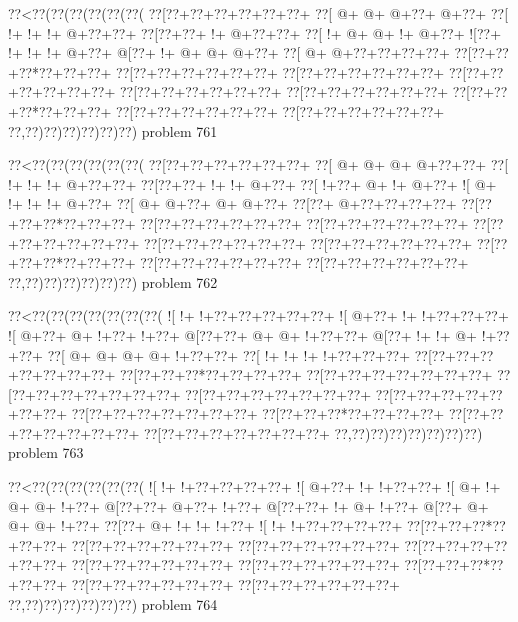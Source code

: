 \vbox{\vbox{\goo
\0??<\0??(\0??(\0??(\0??(\0??(\0??(
\0??[\0??+\0??+\0??+\0??+\0??+\0??+
\0??[\- @+\- @+\- @+\0??+\- @+\0??+
\0??[\- !+\- !+\- !+\- @+\0??+\0??+
\0??[\0??+\0??+\- !+\- @+\0??+\0??+
\0??[\- !+\- @+\- @+\- !+\- @+\0??+
\- ![\0??+\- !+\- !+\- !+\- @+\0??+
\- @[\0??+\- !+\- @+\- @+\- @+\0??+
\0??[\- @+\- @+\0??+\0??+\0??+\0??+
\0??[\0??+\0??+\0??*\0??+\0??+\0??+
\0??[\0??+\0??+\0??+\0??+\0??+\0??+
\0??[\0??+\0??+\0??+\0??+\0??+\0??+
\0??[\0??+\0??+\0??+\0??+\0??+\0??+
\0??[\0??+\0??+\0??+\0??+\0??+\0??+
\0??[\0??+\0??+\0??+\0??+\0??+\0??+
\0??[\0??+\0??+\0??*\0??+\0??+\0??+
\0??[\0??+\0??+\0??+\0??+\0??+\0??+
\0??[\0??+\0??+\0??+\0??+\0??+\0??+
\0??,\0??)\0??)\0??)\0??)\0??)\0??)
}
\hfil problem 761\hfil\break
}

\vbox{\vbox{\goo
\0??<\0??(\0??(\0??(\0??(\0??(\0??(
\0??[\0??+\0??+\0??+\0??+\0??+\0??+
\0??[\- @+\- @+\- @+\- @+\0??+\0??+
\0??[\- !+\- !+\- !+\- @+\0??+\0??+
\0??[\0??+\0??+\- !+\- !+\- @+\0??+
\0??[\- !+\0??+\- @+\- !+\- @+\0??+
\- ![\- @+\- !+\- !+\- !+\- @+\0??+
\0??[\- @+\- @+\0??+\- @+\- @+\0??+
\0??[\0??+\- @+\0??+\0??+\0??+\0??+
\0??[\0??+\0??+\0??*\0??+\0??+\0??+
\0??[\0??+\0??+\0??+\0??+\0??+\0??+
\0??[\0??+\0??+\0??+\0??+\0??+\0??+
\0??[\0??+\0??+\0??+\0??+\0??+\0??+
\0??[\0??+\0??+\0??+\0??+\0??+\0??+
\0??[\0??+\0??+\0??+\0??+\0??+\0??+
\0??[\0??+\0??+\0??*\0??+\0??+\0??+
\0??[\0??+\0??+\0??+\0??+\0??+\0??+
\0??[\0??+\0??+\0??+\0??+\0??+\0??+
\0??,\0??)\0??)\0??)\0??)\0??)\0??)
}
\hfil problem 762\hfil\break
}

\vbox{\vbox{\goo
\0??<\0??(\0??(\0??(\0??(\0??(\0??(\0??(
\- ![\- !+\- !+\0??+\0??+\0??+\0??+\0??+
\- ![\- @+\0??+\- !+\- !+\0??+\0??+\0??+
\- ![\- @+\0??+\- @+\- !+\0??+\- !+\0??+
\- @[\0??+\0??+\- @+\- @+\- !+\0??+\0??+
\- @[\0??+\- !+\- !+\- @+\- !+\0??+\0??+
\0??[\- @+\- @+\- @+\- @+\- !+\0??+\0??+
\0??[\- !+\- !+\- !+\- !+\0??+\0??+\0??+
\0??[\0??+\0??+\0??+\0??+\0??+\0??+\0??+
\0??[\0??+\0??+\0??*\0??+\0??+\0??+\0??+
\0??[\0??+\0??+\0??+\0??+\0??+\0??+\0??+
\0??[\0??+\0??+\0??+\0??+\0??+\0??+\0??+
\0??[\0??+\0??+\0??+\0??+\0??+\0??+\0??+
\0??[\0??+\0??+\0??+\0??+\0??+\0??+\0??+
\0??[\0??+\0??+\0??+\0??+\0??+\0??+\0??+
\0??[\0??+\0??+\0??*\0??+\0??+\0??+\0??+
\0??[\0??+\0??+\0??+\0??+\0??+\0??+\0??+
\0??[\0??+\0??+\0??+\0??+\0??+\0??+\0??+
\0??,\0??)\0??)\0??)\0??)\0??)\0??)\0??)
}
\hfil problem 763\hfil\break
}

\vbox{\vbox{\goo
\0??<\0??(\0??(\0??(\0??(\0??(\0??(
\- ![\- !+\- !+\0??+\0??+\0??+\0??+
\- ![\- @+\0??+\- !+\- !+\0??+\0??+
\- ![\- @+\- !+\- @+\- @+\- !+\0??+
\- @[\0??+\0??+\- @+\0??+\- !+\0??+
\- @[\0??+\0??+\- !+\- @+\- !+\0??+
\- @[\0??+\- @+\- @+\- @+\- !+\0??+
\0??[\0??+\- @+\- !+\- !+\- !+\0??+
\- ![\- !+\- !+\0??+\0??+\0??+\0??+
\0??[\0??+\0??+\0??*\0??+\0??+\0??+
\0??[\0??+\0??+\0??+\0??+\0??+\0??+
\0??[\0??+\0??+\0??+\0??+\0??+\0??+
\0??[\0??+\0??+\0??+\0??+\0??+\0??+
\0??[\0??+\0??+\0??+\0??+\0??+\0??+
\0??[\0??+\0??+\0??+\0??+\0??+\0??+
\0??[\0??+\0??+\0??*\0??+\0??+\0??+
\0??[\0??+\0??+\0??+\0??+\0??+\0??+
\0??[\0??+\0??+\0??+\0??+\0??+\0??+
\0??,\0??)\0??)\0??)\0??)\0??)\0??)
}
\hfil problem 764\hfil\break
}

